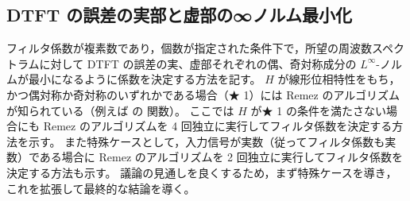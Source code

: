     \subsection{DTFT の誤差の実部と虚部の∞ノルム最小化}
        \newcommand*{\Ntp}{N_{\text{tp}}}
        \newcommand*{\Hid}{H_{\text{id}}}
        \newcommand*{\HidR}{H_{\text{id,r}}}
        \newcommand*{\HidI}{H_{\text{id,i}}}
        \newcommand*{\HidH}{H_{\text{id,H}}}
        \newcommand*{\HidHr}{H_{\text{id,H,r}}}
        \newcommand*{\HidHi}{H_{\text{id,H,i}}}
        \newcommand*{\HidSH}{H_{\text{id,SH}}}
        \newcommand*{\HidSHr}{H_{\text{id,SH,r}}}
        \newcommand*{\HidSHi}{H_{\text{id,SH,i}}}
        \newcommand*{\hes}{h_{\text{es}}}
        \newcommand*{\hos}{h_{\text{os}}}
        \newcommand*{\Hes}{H_{\text{es}}}
        \newcommand*{\Hos}{H_{\text{os}}}
        \newcommand*{\hr}{h_{\text{r}}}
        \newcommand*{\hi}{h_{\text{i}}}
        \newcommand*{\hrEs}{h_{\text{r,es}}}
        \newcommand*{\hrOs}{h_{\text{r,os}}}
        \newcommand*{\hiEs}{h_{\text{i,es}}}
        \newcommand*{\hiOs}{h_{\text{i,os}}}
        \newcommand*{\hesOpt}{h_{\text{es,opt}}}
        \newcommand*{\hosOpt}{h_{\text{os,opt}}}
        \newcommand*{\hopt}{h_{\text{opt}}}
        \newcommand*{\hrEsOpt}{h_{\text{r,es,opt}}}
        \newcommand*{\hrOsOpt}{h_{\text{r,os,opt}}}
        \newcommand*{\hiEsOpt}{h_{\text{i,es,opt}}}
        \newcommand*{\hiOsOpt}{h_{\text{i,os,opt}}}
        \newcommand*{\HesOpt}{H_{\text{es,opt}}}
        \newcommand*{\HosOpt}{H_{\text{os,opt}}}
        \newcommand*{\Hopt}{H_{\text{opt}}}
        \newcommand*{\HrEsOpt}{H_{\text{r,es,opt}}}
        \newcommand*{\HrOsOpt}{H_{\text{r,os,opt}}}
        \newcommand*{\HiEsOpt}{H_{\text{i,es,opt}}}
        \newcommand*{\HiOsOpt}{H_{\text{i,os,opt}}}
        \newcommand*{\eEs}{\mathrm{e}_{\text{es}}}
        \newcommand*{\eOs}{\mathrm{e}_{\text{os}}}
        \newcommand*{\eOpt}{\mathrm{e}_{\text{opt}}}
        \newcommand*{\erEs}{\mathrm{e}_{\text{r,es}}}
        \newcommand*{\erOs}{\mathrm{e}_{\text{r,os}}}
        \newcommand*{\eiEs}{\mathrm{e}_{\text{i,es}}}
        \newcommand*{\eiOs}{\mathrm{e}_{\text{i,os}}}
        フィルタ係数が複素数であり，個数が指定された条件下で，所望の周波数スペクトラムに対して DTFT の誤差の実、虚部それぞれの偶、奇対称成分の $L^\infty$-ノルムが最小になるように係数を決定する方法を記す。
        $H$ が線形位相特性をもち，かつ偶対称か奇対称のいずれかである場合（★ 1）には Remez のアルゴリズムが知られている（例えば \cite{DSP_JL} の  関数）。
        ここでは $H$ が★ 1 の条件を満たさない場合にも Remez のアルゴリズムを 4 回独立に実行してフィルタ係数を決定する方法を示す。
        また特殊ケースとして，入力信号が実数（従ってフィルタ係数も実数）である場合に Remez のアルゴリズムを 2 回独立に実行してフィルタ係数を決定する方法も示す。
        議論の見通しを良くするため，まず特殊ケースを導き，これを拡張して最終的な結論を導く。
